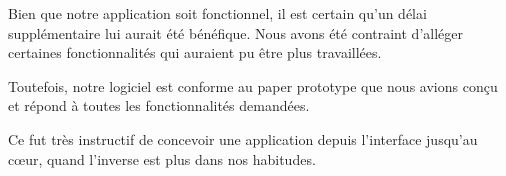 \vspace{0,5cm}

Bien que notre application soit fonctionnel, il est certain qu'un délai supplémentaire lui aurait été bénéfique. Nous avons été contraint d'alléger certaines fonctionnalités qui auraient pu être plus travaillées.

\vspace{0,5cm}

Toutefois, notre logiciel est conforme au paper prototype que nous avions conçu et répond à toutes les fonctionnalités demandées. 

\vspace{0,5cm}

Ce fut très instructif de concevoir une application depuis l'interface jusqu'au c{\oe}ur, quand l'inverse est plus dans nos habitudes.